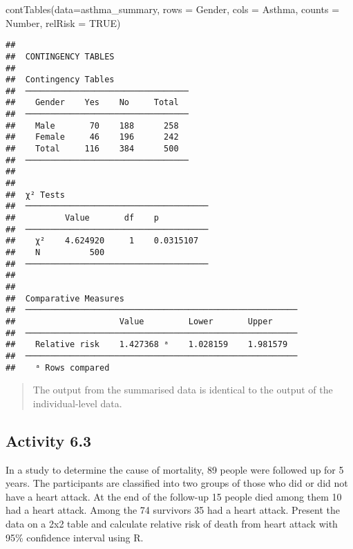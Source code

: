 \documentclass[
]{memoir}
\newenvironment{Shaded}{\begin{snugshade}}{\end{snugshade}}
\newcommand{\AttributeTok}[1]{\textcolor[rgb]{0.77,0.63,0.00}{#1}}
\newcommand{\ConstantTok}[1]{\textcolor[rgb]{0.00,0.00,0.00}{#1}}
\newcommand{\FunctionTok}[1]{\textcolor[rgb]{0.00,0.00,0.00}{#1}}
\newcommand{\NormalTok}[1]{#1}
\begin{document}
\begin{Shaded}
\begin{Highlighting}[]
\FunctionTok{contTables}\NormalTok{(}\AttributeTok{data=}\NormalTok{asthma\_summary,}
           \AttributeTok{rows =}\NormalTok{ Gender, }\AttributeTok{cols =}\NormalTok{ Asthma,}
           \AttributeTok{counts =}\NormalTok{ Number,}
           \AttributeTok{relRisk =} \ConstantTok{TRUE}\NormalTok{)}
\end{Highlighting}
\end{Shaded}

\begin{verbatim}
## 
##  CONTINGENCY TABLES
## 
##  Contingency Tables                
##  ───────────────────────────────── 
##    Gender    Yes    No     Total   
##  ───────────────────────────────── 
##    Male       70    188      258   
##    Female     46    196      242   
##    Total     116    384      500   
##  ───────────────────────────────── 
## 
## 
##  χ² Tests                              
##  ───────────────────────────────────── 
##          Value       df    p           
##  ───────────────────────────────────── 
##    χ²    4.624920     1    0.0315107   
##    N          500                      
##  ───────────────────────────────────── 
## 
## 
##  Comparative Measures                                    
##  ─────────────────────────────────────────────────────── 
##                     Value         Lower       Upper      
##  ─────────────────────────────────────────────────────── 
##    Relative risk    1.427368 ᵃ    1.028159    1.981579   
##  ─────────────────────────────────────────────────────── 
##    ᵃ Rows compared
\end{verbatim}

\begin{quote}
The output from the summarised data is identical to the output of the individual-level data.
\end{quote}

\hypertarget{activity-6.3}{%
\subsection*{Activity 6.3}\label{activity-6.3}}

In a study to determine the cause of mortality, 89 people were followed up for 5 years. The participants are classified into two groups of those who did or did not have a heart attack. At the end of the follow-up 15 people died among them 10 had a heart attack. Among the 74 survivors 35 had a heart attack. Present the data on a 2x2 table and calculate relative risk of death from heart attack with 95\% confidence interval using R.
\end{document}
